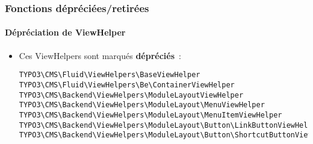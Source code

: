 %

\begin{frame}[fragile]
	\frametitle{Fonctions dépréciées/retirées}
	\framesubtitle{Dépréciation de ViewHelper}


	\begin{itemize}
		\item Ces ViewHelpers sont marqués \textbf{dépréciés}~:
\begin{lstlisting}
TYPO3\CMS\Fluid\ViewHelpers\BaseViewHelper
TYPO3\CMS\Fluid\ViewHelpers\Be\ContainerViewHelper
TYPO3\CMS\Backend\ViewHelpers\ModuleLayoutViewHelper
TYPO3\CMS\Backend\ViewHelpers\ModuleLayout\MenuViewHelper
TYPO3\CMS\Backend\ViewHelpers\ModuleLayout\MenuItemViewHelper
TYPO3\CMS\Backend\ViewHelpers\ModuleLayout\Button\LinkButtonViewHelper
TYPO3\CMS\Backend\ViewHelpers\ModuleLayout\Button\ShortcutButtonViewHelp
\end{lstlisting}

	\end{itemize}

\end{frame}


